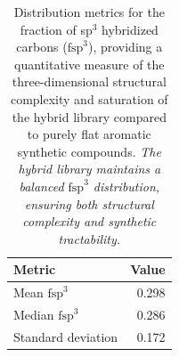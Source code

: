 \documentclass[journal=jcisd8,manuscript=suppinfo]{achemso}
\begin{document}
\begin{table}[!htbp]
\centering
\caption{Distribution metrics for the fraction of sp$^3$ hybridized carbons ($\text{fsp}^3$), providing a quantitative measure of the three-dimensional structural complexity and saturation of the hybrid library compared to purely flat aromatic synthetic compounds. \textit{The hybrid library maintains a balanced $\text{fsp}^3$ distribution, ensuring both structural complexity and synthetic tractability.}}
\label{tab:fsp3}
\begin{tabular}{@{}l r@{}}
\toprule
\textbf{Metric} & \textbf{Value} \\
\midrule
Mean $\text{fsp}^3$ & \num{0.298} \\
Median $\text{fsp}^3$ & \num{0.286} \\
Standard deviation & \num{0.172} \\
\bottomrule
\end{tabular}
\end{table}
\end{document}
